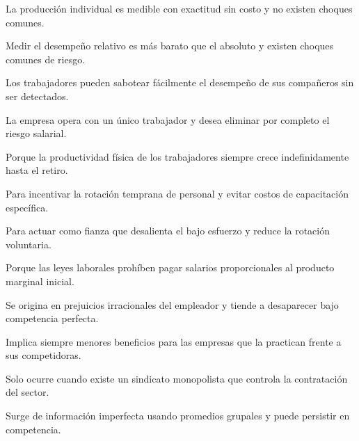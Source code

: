 \begin{opts}
    \item La producción individual es medible con exactitud sin costo y no existen choques comunes.
    \item Medir el desempeño relativo es más barato que el absoluto y existen choques comunes de riesgo.
    \item Los trabajadores pueden sabotear fácilmente el desempeño de sus compañeros sin ser detectados.
    \item La empresa opera con un único trabajador y desea eliminar por completo el riesgo salarial.
\end{opts}

\begin{opts}
    \item Porque la productividad física de los trabajadores siempre crece indefinidamente hasta el retiro.
    \item Para incentivar la rotación temprana de personal y evitar costos de capacitación específica.
    \item Para actuar como fianza que desalienta el bajo esfuerzo y reduce la rotación voluntaria.
    \item Porque las leyes laborales prohíben pagar salarios proporcionales al producto marginal inicial.
\end{opts}

\begin{opts}
    \item Se origina en prejuicios irracionales del empleador y tiende a desaparecer bajo competencia perfecta.
    \item Implica siempre menores beneficios para las empresas que la practican frente a sus competidoras.
    \item Solo ocurre cuando existe un sindicato monopolista que controla la contratación del sector.
    \item Surge de información imperfecta usando promedios grupales y puede persistir en competencia.
\end{opts}

